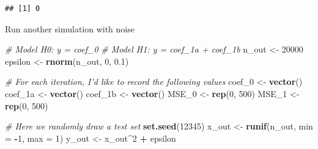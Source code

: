 \documentclass[]{article}
\newenvironment{Shaded}{\begin{snugshade}}{\end{snugshade}}
\newcommand{\KeywordTok}[1]{\textcolor[rgb]{0.13,0.29,0.53}{\textbf{#1}}}
\newcommand{\DataTypeTok}[1]{\textcolor[rgb]{0.13,0.29,0.53}{#1}}
\newcommand{\DecValTok}[1]{\textcolor[rgb]{0.00,0.00,0.81}{#1}}
\newcommand{\FloatTok}[1]{\textcolor[rgb]{0.00,0.00,0.81}{#1}}
\newcommand{\StringTok}[1]{\textcolor[rgb]{0.31,0.60,0.02}{#1}}
\newcommand{\CommentTok}[1]{\textcolor[rgb]{0.56,0.35,0.01}{\textit{#1}}}
\newcommand{\OperatorTok}[1]{\textcolor[rgb]{0.81,0.36,0.00}{\textbf{#1}}}
\newcommand{\NormalTok}[1]{#1}
\begin{document}
\begin{Shaded}
\end{Shaded}

\begin{verbatim}
## [1] 0
\end{verbatim}

Run another simulation with noise

\begin{Shaded}
\begin{Highlighting}[]
\CommentTok{# Model H0: y = coef_0}
\CommentTok{# Model H1: y = coef_1a + coef_1b}
\NormalTok{n_out <-}\StringTok{ }\DecValTok{20000}
\NormalTok{epsilon <-}\StringTok{ }\KeywordTok{rnorm}\NormalTok{(n_out, }\DecValTok{0}\NormalTok{, }\FloatTok{0.1}\NormalTok{)}

\CommentTok{# For each iteration, I'd like to record the following values}
\NormalTok{coef_}\DecValTok{0}\NormalTok{ <-}\StringTok{ }\KeywordTok{vector}\NormalTok{()}
\NormalTok{coef_1a <-}\StringTok{ }\KeywordTok{vector}\NormalTok{()}
\NormalTok{coef_1b <-}\StringTok{ }\KeywordTok{vector}\NormalTok{()}
\NormalTok{MSE_}\DecValTok{0}\NormalTok{ <-}\StringTok{ }\KeywordTok{rep}\NormalTok{(}\DecValTok{0}\NormalTok{, }\DecValTok{500}\NormalTok{)}
\NormalTok{MSE_}\DecValTok{1}\NormalTok{ <-}\StringTok{ }\KeywordTok{rep}\NormalTok{(}\DecValTok{0}\NormalTok{, }\DecValTok{500}\NormalTok{)}

\CommentTok{# Here we randomly draw a test set}
\KeywordTok{set.seed}\NormalTok{(}\DecValTok{12345}\NormalTok{)}
\NormalTok{x_out <-}\StringTok{ }\KeywordTok{runif}\NormalTok{(n_out, }\DataTypeTok{min =} \OperatorTok{-}\DecValTok{1}\NormalTok{, }\DataTypeTok{max =} \DecValTok{1}\NormalTok{)}
\NormalTok{y_out <-}\StringTok{ }\NormalTok{x_out}\OperatorTok{^}\DecValTok{2} \OperatorTok{+}\StringTok{ }\NormalTok{epsilon}


\end{Highlighting}
\end{Shaded}
\end{document}

